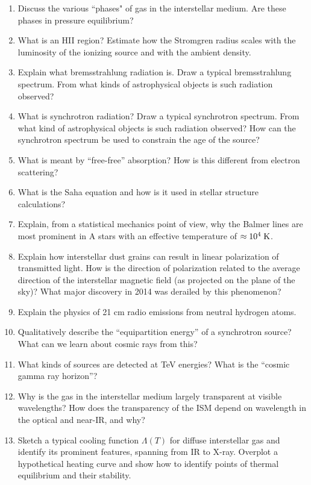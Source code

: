 \documentclass[10pt, oneside]{book}
\begin{document}
\begin{enumerate}[start=72]
    \item Discuss the various ``phases" of gas in the interstellar medium. Are these phases in pressure equilibrium?
    \item What is an HII region? Estimate how the Stromgren radius scales with the luminosity of the ionizing source and with the ambient density.
    \item Explain what bremsstrahlung radiation is. Draw a typical bremsstrahlung spectrum. From what kinds of astrophysical objects is such radiation observed?
    \item What is synchrotron radiation? Draw a typical synchrotron spectrum. From what kind of astrophysical objects is such radiation observed? How can the synchrotron spectrum be used to constrain the age of the source?
    \item What is meant by ``free-free'' absorption? How is this different from electron scattering?
    \item What is the Saha equation and how is it used in stellar structure calculations?
    \item Explain, from a statistical mechanics point of view, why the Balmer lines are most prominent in A stars with an effective temperature of $\approx 10^{4} \; {\rm K}$.
    \item Explain how interstellar dust grains can result in linear polarization of transmitted light. How is the direction of polarization related to the average direction of the interstellar magnetic field (as projected on the plane of the sky)? What major discovery in 2014 was derailed by this phenomenon?
    \item Explain the physics of 21 cm radio emissions from neutral hydrogen atoms.
    \item Qualitatively describe the ``equipartition energy'' of a synchrotron source? What can we learn about cosmic rays from this?
    \item What kinds of sources are detected at TeV energies? What is the ``cosmic gamma ray horizon''?
    \item Why is the gas in the interstellar medium largely transparent at visible wavelengths? How does the transparency of the ISM depend on wavelength in the optical and near-IR, and why?
    \item Sketch a typical cooling function $\Lambda(T)$ for diffuse interstellar gas and identify its prominent features, spanning from IR to X-ray. Overplot a hypothetical heating curve and show how to identify points of thermal equilibrium and their stability.

\end{enumerate}
\end{document}
